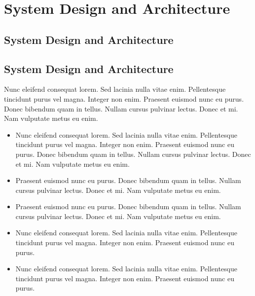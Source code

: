 
\chapter{System Design and Architecture}\doublespacing %

\label{Chapter5} %




\section{System Design and Architecture}
\lipsum[1-4]


\section{System Design and Architecture}
Nunc eleifend consequat lorem. Sed lacinia nulla vitae enim. Pellentesque tincidunt purus vel magna. Integer non enim. Praesent euismod nunc eu purus. Donec bibendum quam in tellus. Nullam cursus pulvinar lectus. Donec et mi. Nam vulputate metus eu enim.

\begin{itemize}

  \item Nunc eleifend consequat lorem. Sed lacinia nulla vitae enim. Pellentesque tincidunt purus vel magna. Integer non enim. Praesent euismod nunc eu purus. Donec bibendum quam in tellus. Nullam cursus pulvinar lectus. Donec et mi. Nam vulputate metus eu enim.
  
  \item Praesent euismod nunc eu purus. Donec bibendum quam in tellus. Nullam cursus pulvinar lectus. Donec et mi. Nam vulputate metus eu enim.
  
  \item Praesent euismod nunc eu purus. Donec bibendum quam in tellus. Nullam cursus pulvinar lectus. Donec et mi. Nam vulputate metus eu enim.
  
  \item Nunc eleifend consequat lorem. Sed lacinia nulla vitae enim. Pellentesque tincidunt purus vel magna. Integer non enim. Praesent euismod nunc eu purus.
  
  \item Nunc eleifend consequat lorem. Sed lacinia nulla vitae enim. Pellentesque tincidunt purus vel magna. Integer non enim. Praesent euismod nunc eu purus.
  
\end{itemize}
    
